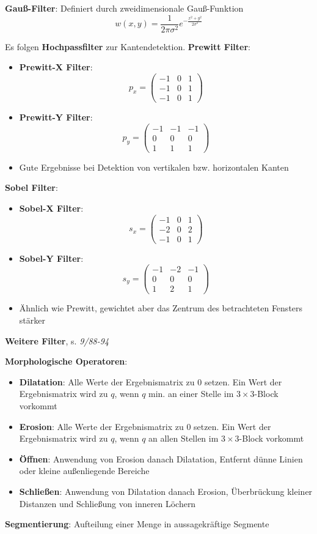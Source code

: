 \textbf{Gauß-Filter}: Definiert durch zweidimensionale Gauß-Funktion
$$w(x,y)=\frac{1}{2\pi\sigma^2}e^{-\frac{x^2+y^2}{2\sigma^2}}$$

Es folgen \textbf{Hochpassfilter} zur Kantendetektion.
\textbf{Prewitt Filter}:
\begin{itemize}
	\item \textbf{Prewitt-X Filter}: $$p_x=\left(
	\begin{matrix}
		-1 & 0 & 1 \\
		-1 & 0 & 1 \\
		-1 & 0 & 1 
	\end{matrix}\right)$$
	\item \textbf{Prewitt-Y Filter}: $$p_y=\left(
	\begin{matrix}
		-1 & -1 & -1 \\
		0 & 0 & 0 \\
		1 & 1 & 1 
	\end{matrix}\right)$$
	\item Gute Ergebnisse bei Detektion von vertikalen bzw. horizontalen Kanten
\end{itemize}

\textbf{Sobel Filter}:
\begin{itemize}
	\item \textbf{Sobel-X Filter}: $$s_x=\left(
	\begin{matrix}
		-1 & 0 & 1 \\
		-2 & 0 & 2 \\
		-1 & 0 & 1 
	\end{matrix}\right)$$
	\item \textbf{Sobel-Y Filter}: $$s_y=\left(
	\begin{matrix}
		-1 & -2 & -1 \\
		0 & 0 & 0 \\
		1 & 2 & 1 
	\end{matrix}\right)$$
	\item Ähnlich wie Prewitt, gewichtet aber das Zentrum des betrachteten Fensters stärker
\end{itemize}

\textbf{Weitere Filter}, s. \textit{9/88-94}\\
\pagebreak

\textbf{Morphologische Operatoren}:
\begin{itemize}
	\item \textbf{Dilatation}: Alle Werte der Ergebnismatrix zu 0 setzen. Ein Wert der Ergebnismatrix wird zu $q$, wenn $q$ min. an einer Stelle im $3\times 3$-Block vorkommt
	\item \textbf{Erosion}: Alle Werte der Ergebnismatrix zu 0 setzen. Ein Wert der Ergebnismatrix wird zu $q$, wenn $q$ an allen Stellen im $3\times 3$-Block vorkommt
	\item \textbf{Öffnen}: Anwendung von Erosion danach Dilatation, Entfernt dünne Linien oder kleine außenliegende Bereiche
	\item \textbf{Schließen}: Anwendung von Dilatation danach Erosion, Überbrückung kleiner Distanzen und Schließung von inneren Löchern
\end{itemize}
\bigskip
\textbf{Segmentierung}: Aufteilung einer Menge in aussagekräftige Segmente\\

